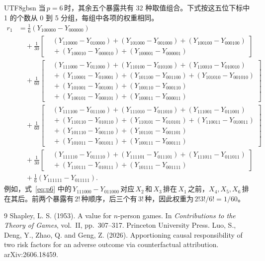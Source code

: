 \documentclass[11pt,a4paper]{article}
\begin{document}
\begin{CJK*}{UTF8}{gbsn}
当\,$p=6$\,时，其余五个暴露共有 32 种取值组合。下式按这五位下标中 1 的个数从 0 到 5 分组，每组中各项的权重相同。
\begin{equation}\label{eq:p6}
\begin{split}
r_1 &= \tfrac{1}{6}(Y_{100000}-Y_{000000}) \\[2pt]
    &\quad + \tfrac{1}{30}\left[\begin{aligned}
        &(Y_{110000}-Y_{010000})+(Y_{101000}-Y_{001000})+(Y_{100100}-Y_{000100}) \\
        &{}+(Y_{100010}-Y_{000010})+(Y_{100001}-Y_{000001})
      \end{aligned}\right] \\[2pt]
    &\quad + \tfrac{1}{60}\left[\begin{aligned}
        &(Y_{111000}-Y_{011000})+(Y_{110100}-Y_{010100})+(Y_{110010}-Y_{010010}) \\
        &{}+(Y_{110001}-Y_{010001})+(Y_{101100}-Y_{001100})+(Y_{101010}-Y_{001010}) \\
        &{}+(Y_{101001}-Y_{001001})+(Y_{100110}-Y_{000110}) \\
        &{}+(Y_{100101}-Y_{000101})+(Y_{100011}-Y_{000011})
      \end{aligned}\right] \\[2pt]
    &\quad + \tfrac{1}{60}\left[\begin{aligned}
        &(Y_{111100}-Y_{011100})+(Y_{111010}-Y_{011010})+(Y_{111001}-Y_{011001}) \\
        &{}+(Y_{110110}-Y_{010110})+(Y_{110101}-Y_{010101})+(Y_{110011}-Y_{010011}) \\
        &{}+(Y_{101110}-Y_{001110})+(Y_{101101}-Y_{001101}) \\
        &{}+(Y_{101011}-Y_{001011})+(Y_{100111}-Y_{000111})
      \end{aligned}\right] \\[2pt]
    &\quad + \tfrac{1}{30}\left[\begin{aligned}
        &(Y_{111110}-Y_{011110})+(Y_{111101}-Y_{011101})+(Y_{111011}-Y_{011011}) \\
        &{}+(Y_{110111}-Y_{010111})+(Y_{101111}-Y_{001111})
      \end{aligned}\right] \\[2pt]
    &\quad + \tfrac{1}{6}(Y_{111111}-Y_{011111}).
\end{split}
\end{equation}
例如，式~\eqref{eq:p6} 中的\,$Y_{111000}-Y_{011000}$\,对应\,$X_2$\,和\,$X_3$\,排在\,$X_1$\,之前，$X_4,X_5,X_6$\,排在其后。前两个暴露有\,$2!$\,种顺序，后三个有\,$3!$\,种，因此权重为\,$2!3!/6!=1/60$。

\begin{thebibliography}{9}
\ifPDFTeX\else{}\fi
\small
\setlength{\itemsep}{2pt}
 Shapley, L. S. (1953).
A value for $n$-person games.
In \textit{Contributions to the Theory of Games}, vol.~II, pp.~307--317. Princeton University Press.
 Luo, S., Deng, Y., Zhao, Q. and Geng, Z. (2026).
Apportioning causal responsibility of two risk factors for an adverse outcome via counterfactual attribution.
arXiv:2606.18459.
\end{thebibliography}
\ifPDFTeX\end{CJK*}\fi
\end{document}
